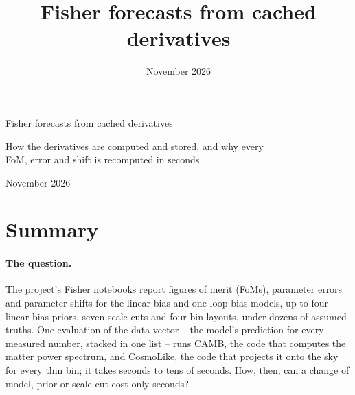 \documentclass[11pt]{article}
\title{Fisher forecasts from cached derivatives}
\date{November 2026}
\author{}
\begin{document}
\begin{center}
  {\LARGE Fisher forecasts from cached derivatives\par}
  \vspace{0.4em}
  {\large How the derivatives are computed and stored, and why every\\
    FoM, error and shift is recomputed in seconds\par}
  \vspace{0.6em}
  {\large November 2026\par}
\end{center}
\vspace{1em}

\section{Summary}
\label{sec:summary}

\paragraph{The question.}
The project's Fisher notebooks report figures of merit (FoMs),
parameter errors and parameter shifts for the linear-bias and one-loop
bias models, up to four
linear-bias priors, seven scale cuts and four bin layouts, under dozens
of assumed truths.  One evaluation of the data vector -- the model's
prediction for every measured number, stacked in one list -- runs
CAMB, the code that computes the matter power spectrum, and CosmoLike,
the code that projects it onto the sky for every thin bin; it takes
seconds to tens of seconds.  How,
then, can a change of model, prior or scale cut cost only seconds?
\end{document}
